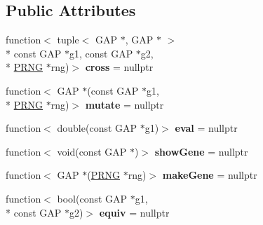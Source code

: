 \subsection*{Public Attributes}
\begin{DoxyCompactItemize}
\item 
\hypertarget{class_k_base_1_1_g_a_opt_aee09bf0ec409419f10fff73ca8a31224}{function$<$ tuple$<$ G\-A\-P $\ast$, G\-A\-P $\ast$ $>$\\*
const G\-A\-P $\ast$g1, const G\-A\-P $\ast$g2, \\*
\hyperlink{class_k_base_1_1_p_r_n_g}{P\-R\-N\-G} $\ast$rng)$>$ {\bfseries cross} = nullptr}\label{class_k_base_1_1_g_a_opt_aee09bf0ec409419f10fff73ca8a31224}

\item 
\hypertarget{class_k_base_1_1_g_a_opt_a6e1ecad6a7ccb08d4b70e7e9c1fd04f4}{function$<$ G\-A\-P $\ast$(const G\-A\-P $\ast$g1, \\*
\hyperlink{class_k_base_1_1_p_r_n_g}{P\-R\-N\-G} $\ast$rng)$>$ {\bfseries mutate} = nullptr}\label{class_k_base_1_1_g_a_opt_a6e1ecad6a7ccb08d4b70e7e9c1fd04f4}

\item 
\hypertarget{class_k_base_1_1_g_a_opt_a03bc51aac124db77e9b88889abbaebbe}{function$<$ double(const G\-A\-P $\ast$g1)$>$ {\bfseries eval} = nullptr}\label{class_k_base_1_1_g_a_opt_a03bc51aac124db77e9b88889abbaebbe}

\item 
\hypertarget{class_k_base_1_1_g_a_opt_ac4a251e61b6daafe83ded6f956e05100}{function$<$ void(const G\-A\-P $\ast$)$>$ {\bfseries show\-Gene} = nullptr}\label{class_k_base_1_1_g_a_opt_ac4a251e61b6daafe83ded6f956e05100}

\item 
\hypertarget{class_k_base_1_1_g_a_opt_a2af02819c506af8a17d595a0fd20dee1}{function$<$ G\-A\-P $\ast$(\hyperlink{class_k_base_1_1_p_r_n_g}{P\-R\-N\-G} $\ast$rng)$>$ {\bfseries make\-Gene} = nullptr}\label{class_k_base_1_1_g_a_opt_a2af02819c506af8a17d595a0fd20dee1}

\item 
\hypertarget{class_k_base_1_1_g_a_opt_afde428b2ce65402d7ca6d9bffdc23299}{function$<$ bool(const G\-A\-P $\ast$g1, \\*
const G\-A\-P $\ast$g2)$>$ {\bfseries equiv} = nullptr}\label{class_k_base_1_1_g_a_opt_afde428b2ce65402d7ca6d9bffdc23299}

\end{DoxyCompactItemize}
